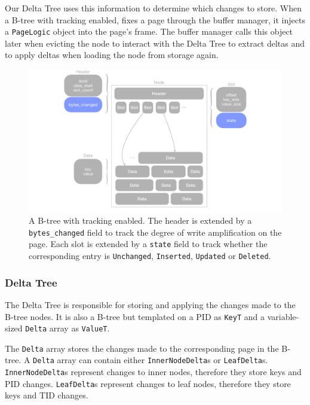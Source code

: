 Our Delta Tree uses this information to determine which changes to store.
When a B-tree with tracking enabled, fixes a page through the buffer manager, it injects a \texttt{PageLogic} object into the page's frame.
The buffer manager calls this object later when evicting the node to interact with the Delta Tree to extract deltas and to apply deltas when loading the node from storage again.

\begin{figure}[htbp]
  \centering
  \includegraphics[width=1\textwidth]{figures/b_tree_with_tracking.pdf}
  \caption{A B-tree with tracking enabled. The header is extended by a \texttt{bytes\_changed} field to track the degree of write amplification on the page. Each slot is extended by a \texttt{state} field to track whether the corresponding entry is \texttt{Unchanged}, \texttt{Inserted}, \texttt{Updated} or \texttt{Deleted}.}
  \label{fig:B-tree-with-tracking}
\end{figure}

\subsubsection*{Delta Tree}
The Delta Tree is responsible for storing and applying the changes made to the B-tree nodes.
It is also a B-tree but templated on a \ac{PID} as \texttt{KeyT} and a variable-sized \texttt{Delta} array as \texttt{ValueT}.

The \texttt{Delta} array stores the changes made to the corresponding page in the B-tree.
A \texttt{Delta} array can contain either \texttt{InnerNodeDelta}s or \texttt{LeafDelta}s.
\texttt{InnerNodeDelta}s represent changes to inner nodes, therefore they store keys and \ac{PID} changes.
\texttt{LeafDelta}s represent changes to leaf nodes, therefore they store keys and \ac{TID} changes.

